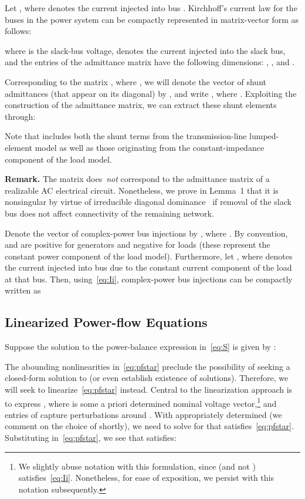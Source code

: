 \documentclass[10 pt, conference]{ieeeconf}
\begin{document}
Let , where  denotes the current injected into bus .  Kirchhoff's current law for the buses in the power system can be compactly represented in matrix-vector form as follows:

where  is the slack-bus voltage,  denotes the current injected into the slack bus, and the entries of the admittance matrix have the following dimensions: , , and . 

Corresponding to the matrix , where ,  we will denote the vector of shunt admittances (that appear on its diagonal) by , and write , where . Exploiting the construction of the admittance matrix, we can extract these shunt elements through:

Note that  includes both the shunt terms from the transmission-line lumped-element model as well as those originating from the constant-impedance component of the  load model. 

\noindent \textbf{Remark.} The matrix  does~\emph{not} correspond to the admittance matrix of a realizable AC electrical circuit. Nonetheless, we prove in Lemma~1 that it is nonsingular by virtue of irreducible diagonal dominance~\cite{Horn:2013} if removal of the slack bus does not affect connectivity of the remaining network.

Denote the vector of complex-power bus injections by , where . By convention,  and  are positive for generators and negative for loads (these represent the constant power component of the  load model). Furthermore, let , where  denotes the current injected into bus  due to the constant current component of the  load at that bus.  Then, using~\eqref{eq:Ii}, complex-power bus injections can be compactly written as


\subsection{Linearized Power-flow Equations} \label{sec:PowerFlow}
Suppose the solution to the power-balance expression in~\eqref{eq:S} is given by :

The abounding nonlinearities in~\eqref{eq:pfstar} preclude the possibility of seeking a closed-form solution to  (or even establish existence of solutions). Therefore, we will seek to linearize~\eqref{eq:pfstar} instead. Central to the linearization approach is to express , where  is some a priori determined nominal voltage vector,\footnote{We slightly abuse notation with this formulation, since  (and not ) satisfies~\eqref{eq:Ii}. Nonetheless, for ease of exposition, we persist with this notation subsequently.} and entries of  capture perturbations around .  With  appropriately determined (we comment on the choice of  shortly), we need to solve for  that satisfies~\eqref{eq:pfstar}.  Substituting  in~\eqref{eq:pfstar}, we see that  satisfies:
\end{document}
